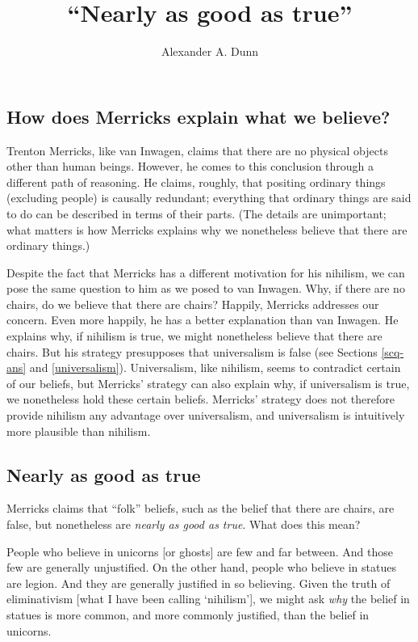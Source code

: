 \documentclass[11pt]{article}
\title{``Nearly as good as true''}
\author{Alexander A. Dunn}
\newenvironment{squote}{%
\begin{spacing}{1}
       	\begin{list}{}{%
\setlength{\labelwidth}{0pt}%
\rightmargin\leftmargin%
}
\item\relax
}{%
\end{list}%
\end{spacing}
}
\begin{document}
\ifstandalone
\maketitle
\begin{spacing}{1.25}
\fi

\section{How does Merricks explain what we believe?}
\label{universe}
\label{merricks}
Trenton Merricks, like van Inwagen, claims that there are no physical
objects other than human beings.  However, he comes to this conclusion
through a different path of reasoning.  He claims, roughly, that
positing ordinary things (excluding people) is causally redundant;
everything that ordinary things are said to do can be described in
terms of their parts. (The details are unimportant; what matters is
how Merricks explains why we nonetheless believe that there are
ordinary things.)

Despite the fact that Merricks has a different motivation for his
nihilism, we can pose the same question to him as we posed to van
Inwagen.  Why, if there are no chairs, do we believe that there are
chairs?  Happily, Merricks addresses our concern.  Even more happily,
he has a better explanation than van Inwagen.  He explains why, if
nihilism is true, we might nonetheless believe that there are chairs.
But his strategy presupposes that universalism is false (see Sections
\ref{scq-ans} and \ref{universalism}).  Universalism, like nihilism,
seems to contradict certain of our beliefs, but Merricks' strategy can
also explain why, if universalism is true, we nonetheless hold these
certain beliefs.  Merricks' strategy does not therefore provide
nihilism any advantage over universalism, and universalism is
intuitively more plausible than nihilism.

\subsection{Nearly as good as true}
\label{near}
Merricks claims that ``folk'' beliefs, such as the belief that there
are chairs, are false, but nonetheless are {\em nearly as good as
  true}.  What does this mean?

\begin{squote}
People who believe in unicorns [or ghosts] are few and far between.
And those few are generally unjustified.  On the other hand, people
who believe in statues are legion.  And they are generally justified
in so believing.  Given the truth of eliminativism [what I have been
  calling `nihilism'], we might ask {\em why} the belief in statues is
more common, and more commonly justified, than the belief in unicorns.


\end{squote}
\end{spacing}
\end{document}
